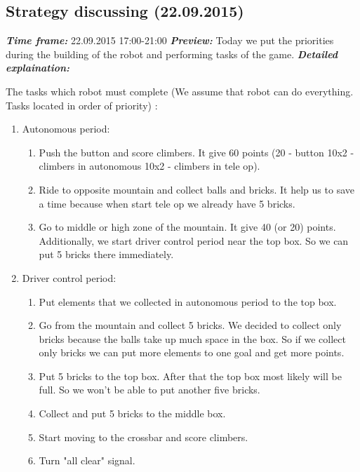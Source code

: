 \subsection{Strategy discussing (22.09.2015)}
	\textit{\textbf{Time frame:}} 22.09.2015 17:00-21:00 \newline
	\textit{\textbf{Preview:}} Today we put the priorities during the building of the robot and performing tasks of the game.\newline \newline
  \textit{\textbf{Detailed explaination:}}
  \begin{enumerate*}
  	\item The tasks which robot must complete (We assume that robot can do everything. Tasks located in order of priority) :
  	\begin{enumerate}
  		\item Autonomous period:
  		\begin{enumerate}
  			\item Push the button and score climbers. It give 60 points (20 - button 10x2 - climbers in autonomous 10x2 - climbers in tele op).
  			\item Ride to opposite mountain and collect balls and bricks. It help us to save a time because when start tele op we already have 5 bricks. 
  			\item Go to middle or high zone of the mountain. It give 40 (or 20) points. Additionally, we start driver control period near the top box. So we can put 5 bricks there immediately.
  		\end{enumerate}
  		\item Driver control period:
  		\begin{enumerate}
	  		\item Put elements that we collected in autonomous period to the top box.
	  		\item Go from the mountain and collect 5 bricks. We decided to collect only bricks because the balls take up much space in the box. So if we collect only bricks we can put more elements to one goal and get more points.
	  		\item Put 5 bricks to the top box. After that the top box most likely will be full. So we won't be able to put another five bricks.
	  		\item Collect and put 5 bricks to the middle box.
	  		\item Start moving to the crossbar and score climbers.
	  		\item Turn "all clear" signal.

\end{enumerate}
\end{enumerate}
\end{enumerate*}
